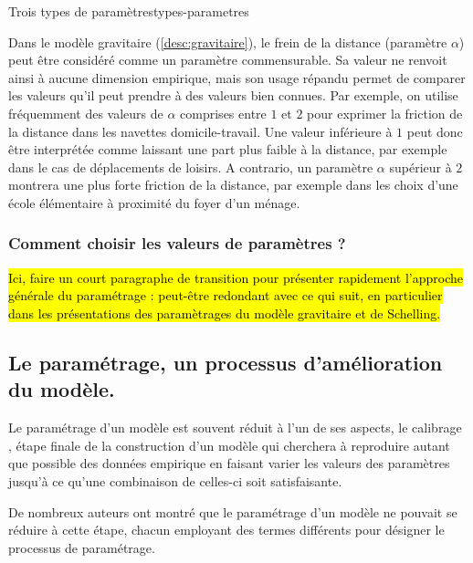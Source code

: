 \begin{encadre}{Trois types de paramètres}{types-parametres}
\begin{description}
		\begin{mdframed}[backgroundcolor=gray!10,footnoteinside=false]
			Dans le modèle gravitaire (\cref{desc:gravitaire}), le frein de la distance (paramètre $\alpha$) peut être considéré comme un paramètre commensurable. Sa valeur ne renvoit ainsi à aucune dimension empirique, mais son usage répandu permet de comparer les valeurs qu'il peut prendre à des valeurs bien connues. Par exemple, on utilise fréquemment des valeurs de $\alpha$ comprises entre $1$ et $2$ pour exprimer la friction de la distance dans les navettes domicile-travail. Une valeur inférieure à $1$ peut donc être interprétée comme laissant une part plus faible à la distance, par exemple dans le cas de déplacements de loisirs. A contrario, un paramètre $\alpha$ supérieur à $2$ montrera une plus forte friction de la distance, par exemple dans les choix d'une école élémentaire à proximité du foyer d'un ménage.
		\end{mdframed}
	\end{description}
\end{encadre}


\subsubsection{Comment choisir les valeurs de paramètres ?}

\hl{Ici, faire un court paragraphe de transition pour présenter rapidement l'approche générale du paramétrage : peut-être redondant avec ce qui suit, en particulier dans les présentations des paramètrages du modèle gravitaire et de Schelling.}

\subsection{Le paramétrage, un processus d'amélioration du modèle.}

Le paramétrage d'un modèle est souvent réduit à l'un de ses aspects, le \og calibrage \fg, étape finale de la construction d'un modèle qui cherchera à reproduire autant que possible des données empirique en faisant varier les valeurs des paramètres jusqu'à ce qu'une combinaison de celles-ci soit satisfaisante.

De nombreux auteurs ont montré que le paramétrage d'un modèle ne pouvait se réduire à cette étape, chacun employant des termes différents pour désigner le processus de paramétrage.

